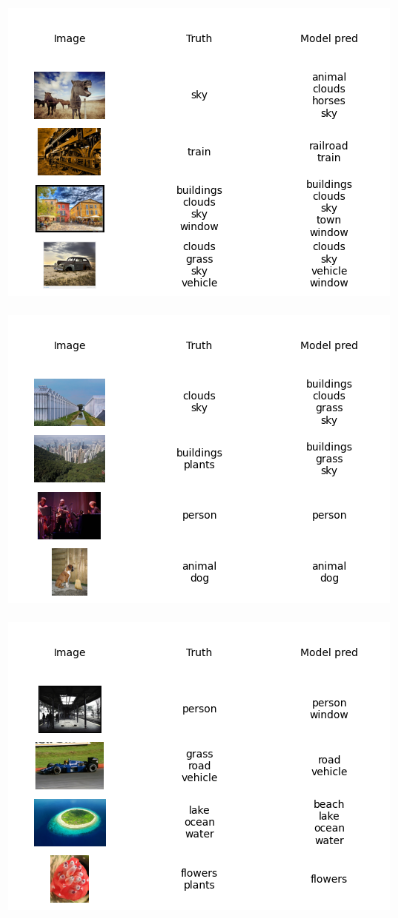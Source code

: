\documentclass{udstu}
\begin{document}
\begin{figure}[!ht]
	\centering
	\includegraphics[width=0.9\textwidth]{PNG/showcase-150}
	\caption{}
\end{figure}

\begin{figure}[!ht]
	\centering
	\includegraphics[width=0.9\textwidth]{PNG/showcase-175}
	\caption{}
\end{figure}

\begin{figure}[!ht]
	\centering
	\includegraphics[width=0.9\textwidth]{PNG/showcase-200}
	\caption{}
\end{figure}
\end{document}
